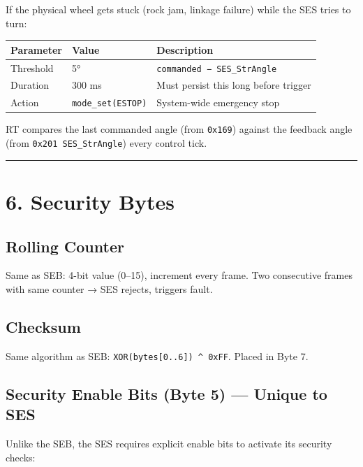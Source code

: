 \documentclass[12pt,a4paper,oneside]{report}
\begin{document}
If the physical wheel gets stuck (rock jam, linkage failure) while the SES
tries to turn:

\begin{longtable}[]{@{}lll@{}}
\toprule\noalign{}
Parameter & Value & Description \\
\midrule\noalign{}
\endhead
\bottomrule\noalign{}
\endlastfoot
Threshold & 5° & \texttt{\textbar{}commanded\ −\ SES\_StrAngle\textbar{}} \\
Duration & 300 ms & Must persist this long before trigger \\
Action & \texttt{mode\_set(ESTOP)} & System-wide emergency stop \\
\end{longtable}

RT compares the last commanded angle (from \texttt{0x169}) against the feedback
angle (from \texttt{0x201\ SES\_StrAngle}) every control tick.

\begin{center}\rule{0.5\linewidth}{0.5pt}\end{center}

\section{6. Security Bytes}\label{security-bytes}

\subsection{Rolling Counter}\label{rolling-counter}

Same as SEB: 4-bit value (0--15), increment every frame. Two consecutive frames
with same counter → SES rejects, triggers fault.

\subsection{Checksum}\label{checksum}

Same algorithm as SEB: \texttt{XOR(bytes{[}0..6{]})\ \^{}\ 0xFF}. Placed in Byte
7.

\subsection{Security Enable Bits (Byte 5) --- Unique to
SES}\label{security-enable-bits-byte-5-unique-to-SES}

Unlike the SEB, the SES requires explicit enable bits to activate its security
checks:
\end{document}
